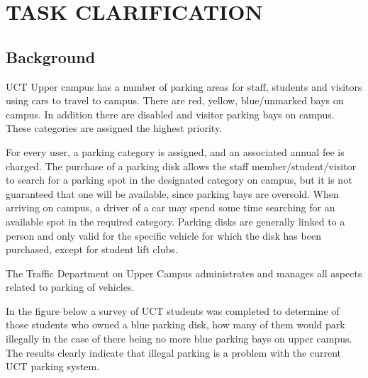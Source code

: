 
\newpage
\tableofcontents



\newcommand{\lsec}[1]{\normalsize{\textbf{#1}}\\}

\newpage

\section{TASK CLARIFICATION}
\subsection{Background}
UCT Upper campus has a number of parking areas for staff, students and visitors using cars to travel to campus. There are red, yellow, blue/unmarked bays on campus. In addition there are disabled and 
visitor parking bays on campus. These categories are assigned the highest priority. 

For every user, a parking category is assigned, and an associated annual fee is charged.  The purchase of a parking disk allows the staff member/student/visitor to search for a parking spot in the designated category on campus, but it is not guaranteed that one will be available, since parking bays are oversold. When arriving on campus, a driver of a car may spend some time searching for an available spot in the required category. Parking disks are generally linked to a person and only valid for the specific vehicle for which the disk has been purchased, except for student lift clubs.

The Traffic  Department  on  Upper  Campus  administrates  and  manages  all  aspects  related  to  parking  of vehicles.\cite{assignment}

In the figure below a survey of UCT students was completed to determine of those students who owned a blue parking disk, how many of them would park illegally in the case of there being no more blue parking bays on upper campus. The results clearly indicate that illegal parking is a problem with the current UCT parking system.

